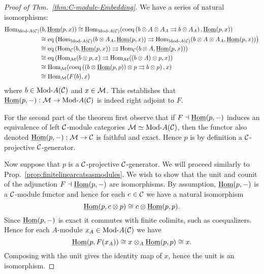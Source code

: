 \documentclass{amsart}
\begin{document}
\begin{proof}[Proof of Thm.~\ref{thm:C-module-Embedding}]
	We have a series of natural isomorphisms:
	\begin{align*}
		\Hom_{\Mod{}{A}(\cC)}&(b, \IHom(p,x))  \cong \Hom_{\Mod{}{A}(\cC)}( \coeq \left( b \otimes A \otimes A_A \rightrightarrows b \otimes A_A  \right), \IHom(p,x)) \\
		& \cong \eq \left( \Hom_{\Mod{}{A}(\cC)}(b \otimes A_A, \IHom(p,x) )  \rightrightarrows \Hom_{\Mod{}{A}(\cC)}(  b \otimes A \otimes A_A, \IHom(p,x))  \right) \\
		& \cong \eq \left( \Hom_{\cC}(b, \IHom(p,x) )  \rightrightarrows \Hom_{\cC}(  b \otimes A, \IHom(p,x))  \right) \\
		& \cong \eq \left( \Hom_{\cM}(b \otimes p, x )  \rightrightarrows \Hom_{\cM}(  (b \otimes A) \otimes p, x)  \right) \\
		& \cong  \Hom_{\cM}( \coeq \left( (b \otimes \IHom(p,p)) \otimes p \rightrightarrows b \otimes p \right), x) \\
		& \cong \Hom_{\cM}( F(b), x)
	\end{align*}  
	where $b \in \Mod{}{A}(\cC)$ and $x \in \mathcal M$. This establishes that $\IHom(p,-): \cM \to \Mod{}{A}(\cC)$ is indeed right adjoint to $F$.

%

For the second part of the theorem first observe that if $F \dashv \operatorname{\underline{Hom}}(p,-)$ induces an equivalence of left $\mathcal C$-module categories $\cM \simeq \Mod{}{A}(\cC)$, then the functor also denoted $\operatorname{\underline{Hom}}(p, -): \mathcal M \to \mathcal C$ is faithful and exact. Hence $p$ is by definition a $\mathcal C$-projective $\mathcal C$-generator.

Now suppose that $p$ is a $\mathcal C$-projective $\mathcal C$-generator.  We will proceed similarly to Prop.~\ref{prop:finitelinearcatsasmodules}.
We wish to show that the unit and counit of the adjunction $F \dashv \operatorname{\underline{Hom}}(p,-)$ are isomorphisms. By assumption, $\operatorname{\underline{Hom}}(p, -)$ is a $\mathcal C$-module functor and hence for each $c \in \mathcal C$ we have a natural isomorphism
\begin{equation*}
	\operatorname{\underline{Hom}}(p, c \otimes p) \cong c \otimes \operatorname{\underline{Hom}}(p, p).
\end{equation*}
 Since $\operatorname{\underline{Hom}}(p, -)$ is exact it commutes with finite colimits, such as coequalizers. Hence for each $A$-module $x_A \in \Mod{}{A}(\cC)$ we have
 \begin{equation*}
 	\operatorname{\underline{Hom}}(p, F(x_A)) \cong x \otimes_A \operatorname{\underline{Hom}}(p,p) \cong x.
 \end{equation*}
Composing with the unit gives the identity map of $x$, hence the unit is an isomorphism. 


\end{proof}
\end{document}
